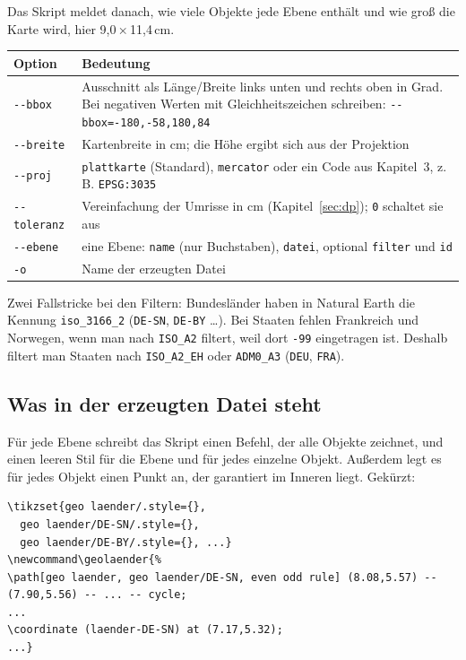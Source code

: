 Das Skript meldet danach, wie viele Objekte jede Ebene enthält und wie groß die Karte wird, hier 9,0\,×\,11,4\,cm.

\begin{center}
\small
\begin{tabular}{@{}l>{\raggedright\arraybackslash}p{11.5cm}@{}}
	\toprule
	\textbf{Option} & \textbf{Bedeutung} \\
	\midrule
	\texttt{-{}-bbox} & Ausschnitt als Länge/Breite links unten und rechts oben in Grad. Bei negativen Werten mit Gleichheitszeichen schreiben: \texttt{-{}-bbox=-180,-58,180,84} \\
	\texttt{-{}-breite} & Kartenbreite in cm; die Höhe ergibt sich aus der Projektion \\
	\texttt{-{}-proj} & \texttt{plattkarte} (Standard), \texttt{mercator} oder ein Code aus Kapitel~3, z.\,B. \texttt{EPSG:3035} \\
	\texttt{-{}-toleranz} & Vereinfachung der Umrisse in cm (Kapitel~\ref{sec:dp}); \texttt{0} schaltet sie aus \\
	\texttt{-{}-ebene} & eine Ebene: \texttt{name} (nur Buchstaben), \texttt{datei}, optional \texttt{filter} und \texttt{id} \\
	\texttt{-o} & Name der erzeugten Datei \\
	\bottomrule
\end{tabular}
\end{center}

Zwei Fallstricke bei den Filtern: Bundesländer haben in Natural Earth die Kennung \texttt{iso\_3166\_2} (\texttt{DE-SN}, \texttt{DE-BY} \dots). Bei Staaten fehlen Frankreich und Norwegen, wenn man nach \texttt{ISO\_A2} filtert, weil dort \texttt{-99} eingetragen ist. Deshalb filtert man Staaten nach \texttt{ISO\_A2\_EH} oder \texttt{ADM0\_A3} (\texttt{DEU}, \texttt{FRA}).


\subsection{Was in der erzeugten Datei steht}

Für jede Ebene schreibt das Skript einen Befehl, der alle Objekte zeichnet, und einen leeren Stil für die Ebene und für jedes einzelne Objekt. Außerdem legt es für jedes Objekt einen Punkt an, der garantiert im Inneren liegt. Gekürzt:

\begin{lstlisting}[style=latex]
\tikzset{geo laender/.style={},
  geo laender/DE-SN/.style={},
  geo laender/DE-BY/.style={}, ...}
\newcommand\geolaender{%
\path[geo laender, geo laender/DE-SN, even odd rule] (8.08,5.57) -- (7.90,5.56) -- ... -- cycle;
...
\coordinate (laender-DE-SN) at (7.17,5.32);
...}
\end{lstlisting}

